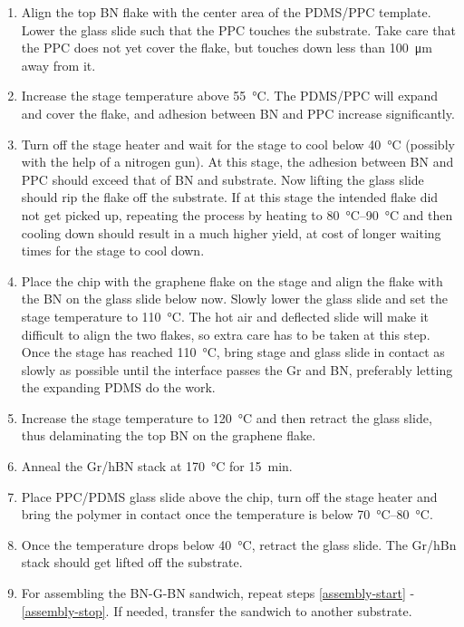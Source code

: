 \begin{enumerate}
	\item Align the top BN flake with the center area of the PDMS/PPC template.
	Lower the glass slide such that the PPC touches the substrate.
	Take care that the PPC does not yet cover the flake, but touches down less than \SI{100}{\micro\meter} away from it.
	\item Increase the stage temperature above \SI{55}{\celsius}.
	The PDMS/PPC will expand and cover the flake, and adhesion between BN and PPC increase significantly.
	\item Turn off the stage heater and wait for the stage to cool below \SI{40}{\celsius} (possibly with the help of a nitrogen gun).
	At this stage, the adhesion between BN and PPC should exceed that of BN and substrate.
	Now lifting the glass slide should rip the flake off the substrate.
	If at this stage the intended flake did not get picked up, repeating the process by heating to \SIrange{80}{90}{\celsius} and then cooling down should result in a much higher yield, at cost of longer waiting times for the stage to cool down.
	\item Place the chip with the graphene flake on the stage and align the flake with the BN on the glass slide below now.
	Slowly lower the glass slide and set the stage temperature to \SI{110}{\celsius}. 
	The hot air and deflected slide will make it difficult to align the two flakes, so extra care has to be taken at this step.
	Once the stage has reached \SI{110}{\celsius}, bring stage and glass slide in contact as slowly as possible until the interface passes the Gr and BN, preferably letting the expanding PDMS do the work.
	\label{assembly-start}
	\item Increase the stage temperature to \SI{120}{\celsius} and then retract the glass slide, thus delaminating the top BN on the graphene flake.
	\label{flake-delam}
	\item Anneal the Gr/hBN stack at \SI{170}{\celsius} for \SI{15}{\minute}.
	\item Place PPC/PDMS glass slide above the chip, turn off the stage heater and bring the polymer in contact once the temperature is below \SIrange{70}{80}{\celsius}.
	\item Once the temperature drops below \SI{40}{\celsius}, retract the glass slide.
	The Gr/hBn stack should get lifted off the substrate.
	\label{assembly-stop}
	\item For assembling the BN-G-BN sandwich, repeat steps \ref{assembly-start} - \ref{assembly-stop}.
	If needed, transfer the sandwich to another substrate.
\end{enumerate}


